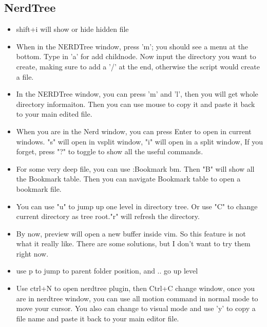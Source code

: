 \documentclass[a4paper,12pt,twoside]{book}
\begin{document}
\subsection{NerdTree}
\begin{itemize}
		\item shift+i will show or hide hidden file
		\item When in the NERDTree window, press 'm'; you should see a menu at the bottom. Type in 'a' for add childnode. Now input the directory you want to create, making sure to add a '/' at the end, otherwise the script would create a file.
		\item In the NERDTree window, you can press 'm' and 'l', then you will get whole directory informaiton. Then you can use mouse to copy it and paste it back to your main edited file.
		\item When you are in the Nerd window, you can press Enter to open in current windows. "s" will open in vsplit window, "i" will open in a split window, If you forget, press "?" to toggle to show all the useful commands.

		\item For some very deep file, you can use :Bookmark bm. Then "B" will show all the Bookmark table. Then you can navigate Bookmark table to open a bookmark file.
		\item You can use "u" to jump up one level in directory tree. Or use "C" to change current directory as tree root."r" will refresh the directory.
		\item By now, preview will open a new buffer inside vim. So this feature is not what it really like. There are some solutions, but I don't want to try them right now.

		\item use p to jump to parent folder position, and .. go up level
		\item Use ctrl+N to open nerdtree plugin, then Ctrl+C change window, once you are in nerdtree window, you can use all motion command in normal mode to move your cursor. You also can change to visual mode and use 'y' to copy a file name and paste it back to your main editor file.  
\end{itemize}
\end{document}
